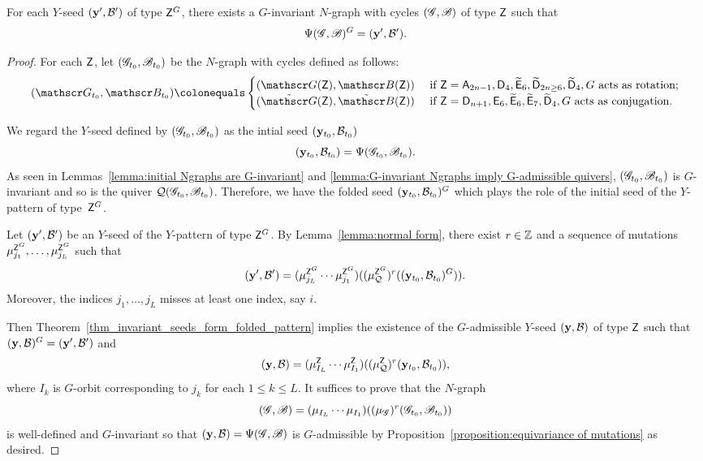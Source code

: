 \begin{proposition}\label{proposition:G-invariant Ngraphs}
For each $Y$-seed $(\mathbf{y}',\mathcal{B}')$ of type ${\mathsf{Z}^G}$, there exists a $G$-invariant $N$-graph with cycles $(\mathscr{G}, \mathscr{B})$ of type $\mathsf{Z}$ such that
\[
\Psi(\mathscr{G}, \mathscr{B})^G = (\mathbf{y}',\mathcal{B}').
\]
\end{proposition}
\begin{proof}
For each $\mathsf{Z}$, let $(\mathscr{G}_{t_0},\mathscr{B}_{t_0})$ be the $N$-graph with cycles defined as follows:
\begin{align*}
(\ngraph_{t_0},\nbasis_{t_0}) \colonequals
\begin{cases}
(\ngraph(\dynX),\nbasis(\dynX)) & \text{ if } \dynX=\dynA_{2n-1}, \dynD_4, \exdynE_6, \exdynD_{2n\ge 6}, \exdynD_4, G\text{ acts as rotation};\\
(\tilde\ngraph(\dynX),\tilde\nbasis(\dynX)) & \text{ if } \dynX=\dynD_{n+1}, \dynE_6, \exdynE_6, \exdynE_7, \exdynD_4, G\text{ acts as conjugation}.
\end{cases}
\end{align*}

We regard the $Y$-seed defined by $(\mathscr{G}_{t_0},\mathscr{B}_{t_0})$ as the intial seed $(\mathbf{y}_{t_0}, \mathcal{B}_{t_0})$
\[
(\mathbf{y}_{t_0}, \mathcal{B}_{t_0})=\Psi(\mathscr{G}_{t_0},\mathscr{B}_{t_0}).
\]
As seen in Lemmas~\ref{lemma:initial Ngraphs are G-invariant} and \ref{lemma:G-invariant Ngraphs imply G-admissible quivers},  $(\mathscr{G}_{t_0},\mathscr{B}_{t_0})$ is $G$-invariant and so is the quiver $\mathcal{Q}(\mathscr{G}_{t_0},\mathscr{B}_{t_0})$.
Therefore, we have the folded seed $(\mathbf{y}_{t_0}, \mathcal{B}_{t_0})^G$ which plays the role of the initial seed of the $Y$-pattern of type~${\mathsf{Z}^G}$.

Let $(\mathbf{y}', \mathcal{B}')$ be an $Y$-seed of the $Y$-pattern of type ${\mathsf{Z}^G}$.
By Lemma~\ref{lemma:normal form}, there exist $r\in \mathbb{Z}$ and a sequence of mutations $\mu_{j_1}^{\mathsf{Z}^G}, \dots, \mu_{j_L}^{\mathsf{Z}^G}$ such that 
\[
(\mathbf{y}', \mathcal{B}') = (\mu_{j_L}^{\mathsf{Z}^G}\cdots\mu_{j_1}^{\mathsf{Z}^G})
((\mu_\mathcal{Q}^{\mathsf{Z}^G})^r((\mathbf{y}_{t_0}, \mathcal{B}_{t_0})^G)).
\]
Moreover, the indices $j_1,\dots, j_L$ misses at least one index, say $i$.

Then Theorem~\ref{thm_invariant_seeds_form_folded_pattern} implies the existence of the $G$-admissible $Y$-seed $(\mathbf{y}, \mathcal{B})$ of type $\mathsf{Z}$ such that $(\mathbf{y},\mathcal{B})^G=(\mathbf{y}',\mathcal{B}')$ and
\[
(\mathbf{y},\mathcal{B}) = (\mu_{I_L}^\mathsf{Z}\cdots\mu_{I_1}^\mathsf{Z})
((\mu_\mathcal{Q}^\mathsf{Z})^r(\mathbf{y}_{t_0},\mathcal{B}_{t_0})),
\]
where $I_k$ is $G$-orbit corresponding to $j_k$ for each $1\le k\le L$.
It suffices to prove that the $N$-graph
\[
(\mathscr{G}, \mathscr{B})=(\mu_{I_L}\cdots\mu_{I_1})((\mu_\mathscr{G})^r(\mathscr{G}_{t_0},\mathscr{B}_{t_0}))
\]
is well-defined and $G$-invariant so that $(\mathbf{y}, \mathcal{B})=\Psi(\mathscr{G},\mathscr{B})$ is $G$-admissible by Proposition~\ref{proposition:equivariance of mutations} as desired.


\end{proof}
